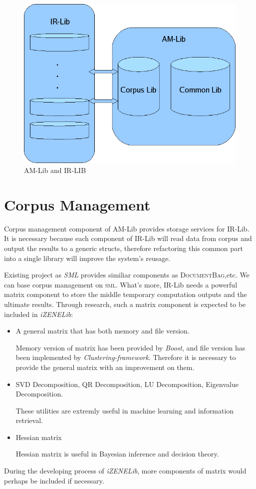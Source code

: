 \documentclass[a4paper,10pt]{article}
\begin{document}
\begin{figure}[ht]\centering
  \includegraphics[width=.7\textwidth]{fig1.png}
  \caption{AM-Lib and IR-LIB}\label{fig:pic}
\end{figure}

\section{Corpus Management}
Corpus management component of AM-Lib provides storage services for IR-Lib. It is necessary because each component of 
IR-Lib will read data from corpus and output the results to a generic structs, therefore refactoring this common part into a 
single library will improve the system's reusage.
\par
Existing project as \emph{SML} provides similiar components as \textsc{DocumentBag},etc. We can base corpus management on
\textsc{sml}. What's more, IR-Lib needs a powerful matrix component to store the middle temporary computation outputs and 
the ultimate results. Through research, such a matrix component is expected to be included in \emph{iZENELib}:

\label{sec:notation}

\begin{itemize}
\item A general matrix that has both memory and file version.

  Memory version of matrix has been provided by \emph{Boost}, and file version has been implemented by \emph{Clustering-framework}.
Therefore it is necessary to provide the general matrix with an improvement on them.

\item SVD Decomposition, QR Decomposition, LU Decomposition, Eigenvalue Decomposition.

 These utilities are extremly useful in machine learning and information retrieval.

\item Hessian matrix 

 Hessian matrix is useful in Bayesian inference and decision theory.
\end{itemize}
 \par
During the developing process of \emph{iZENELib}, more components of matrix would perhaps be included if necessary.
\end{document}
